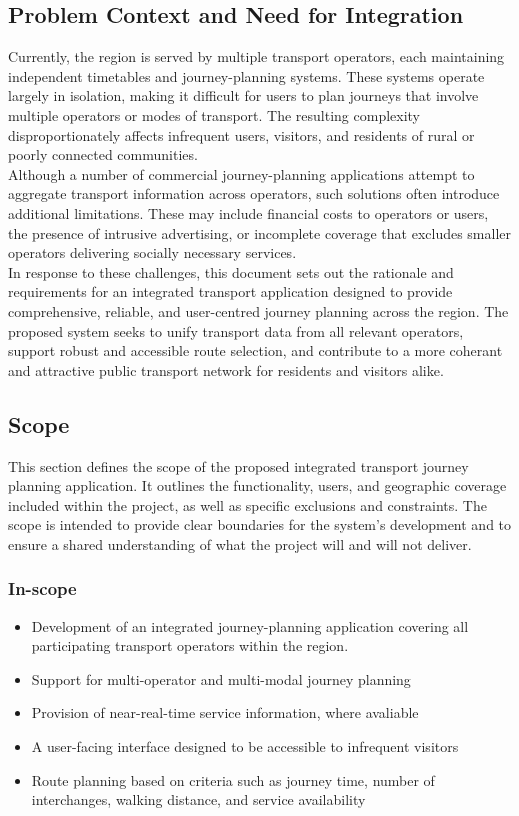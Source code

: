 \documentclass{article}
\begin{document}
\subsection{Problem Context and Need for Integration}
Currently, the region is served by multiple transport operators, each maintaining independent timetables and journey-planning systems. These systems operate largely in isolation, making it difficult for users to plan journeys that involve multiple operators or modes of transport. The resulting complexity disproportionately affects infrequent users, visitors, and residents of rural or poorly connected communities. \\

Although a number of commercial journey-planning applications attempt to aggregate transport information across operators, such solutions often introduce additional limitations. These may include financial costs to operators or users, the presence of intrusive advertising, or incomplete coverage that excludes smaller operators delivering socially necessary services. \\

In response to these challenges, this document sets out the rationale and requirements for an integrated transport application designed to provide comprehensive, reliable, and user-centred journey planning across the region. The proposed system seeks to unify transport data from all relevant operators, support robust and accessible route selection, and contribute to a more coherant and attractive public transport network for residents and visitors alike.

\subsection{Scope}
This section defines the scope of the proposed integrated transport journey planning application. It outlines the functionality, users, and geographic coverage included within the project, as well as specific exclusions and constraints. The scope is intended to provide clear boundaries for the system's development and to ensure a shared understanding of what the project will and will not deliver. \\

\subsubsection{In-scope}
\begin{itemize}
    \item Development of an integrated journey-planning application covering all participating transport operators within the region.
    \item Support for multi-operator and multi-modal journey planning
    \item Provision of near-real-time service information, where avaliable
    \item A user-facing interface designed to be accessible to infrequent visitors 
    \item Route planning based on criteria such as journey time, number of interchanges, walking distance, and service availability
\end{itemize}
\end{document}
